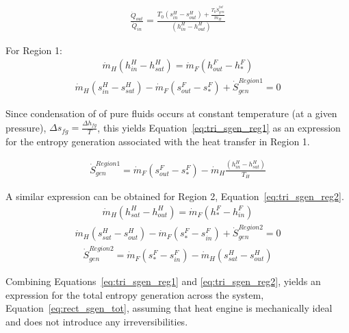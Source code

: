         \begin{align}
             \frac{\Dot{Q}_{out}}{\Dot{Q}_{in}} = \frac{T_0 (s_{in}^{H}-s_{out}^{H}) + \frac{T_0\Dot{S}_{gen}^{tot}}{\Dot{m}_{H}}}{(h_{in}^{H}-h_{out}^{H})} \label{eq:tri_Qratio}
        \end{align}

        For Region 1:
        \begin{align}
             \Dot{m}_{H}(h_{in}^{H}-h_{sat}^{H}) = \Dot{m}_{F}(h_{out}^{F}-h_{*}^{F}) \label{eq:tri_h_bal_reg1}
        \end{align}
        \begin{align}
            \Dot{m}_{H}(s_{in}^{H}-s_{sat}^{H}) - \Dot{m}_{F}(s_{out}^{F}-s_{*}^{F}) + \Dot{S}_{gen}^{Region 1} = 0 \label{eq:tri_s_bal_reg1}
        \end{align}

       Since condensation of of pure fluids occurs at constant temperature (at a given pressure), \(\Delta s_{fg}=\frac{\Delta h_{fg}}{T}\), this yields Equation~\ref{eq:tri_sgen_reg1} as an expression for the entropy generation associated with the heat transfer in Region 1.

        \begin{align}
            \Dot{S}_{gen}^{Region 1} = \Dot{m}_{F}(s_{out}^{F}-s_{*}^{F}) - \Dot{m}_{H} \frac{(h_{in}^{H}-h_{sat}^{H})}{T_H}\label{eq:tri_sgen_reg1}
        \end{align}

        A similar expression can be obtained for Region 2, Equation~\ref{eq:tri_sgen_reg2}.
        \begin{align}
             \Dot{m}_{H}(h_{sat}^{H}-h_{out}^{H}) = \Dot{m}_{F}(h_{*}^{F}-h_{in}^{F}) \label{eq:tri_h_bal_reg2}
        \end{align}
        \begin{align}
            \Dot{m}_{H}(s_{sat}^{H}-s_{out}^{H}) - \Dot{m}_{F}(s_{*}^{F}-s_{in}^{F}) + \Dot{S}_{gen}^{Region 2} = 0 \label{eq:tri_s_bal_reg2}
        \end{align}
        \begin{align}
            \Dot{S}_{gen}^{Region 2} = \Dot{m}_{F}(s_{*}^{F}-s_{in}^{F}) - \Dot{m}_{H}(s_{sat}^{H}-s_{out}^{H})  \label{eq:tri_sgen_reg2}
        \end{align}

        Combining Equations~\ref{eq:tri_sgen_reg1} and \ref{eq:tri_sgen_reg2}, yields an expression for the total entropy generation across the system, Equation~\ref{eq:rect_sgen_tot}, assuming that heat engine is mechanically ideal and does not introduce any irreversibilities.

